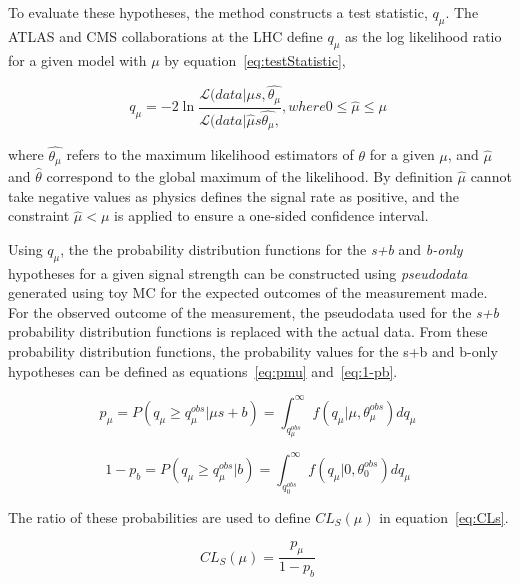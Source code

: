 To evaluate these hypotheses, the method constructs a test statistic, $q_{\mu}$.
The ATLAS and CMS collaborations at the LHC define $q_{\mu}$ as the log likelihood ratio for a given model with $\mu$ by equation~\ref{eq:testStatistic},

\begin{equation}
q_{\mu} =  -2 \ln \frac{ \mathcal{L}(data | \mu s , \hat{\theta_{\mu}}}{ \mathcal{L}(data | \hat{\mu} s \hat{\theta_{\mu}},  } , where 0 \leq \hat{\mu} \leq \mu \;
\label{eq:testStatistic}
\end{equation}

where $\hat{\theta_{\mu}}$ refers to the maximum likelihood estimators of $\theta$ for a given $\mu$, and 
$\hat{\mu}$ and $\hat{\theta}$ correspond to the global maximum of the likelihood. 
By definition $\hat{\mu}$ cannot take negative values as physics defines the signal rate as positive, and the constraint $\hat{\mu} < \mu$ is applied to ensure a one-sided confidence interval.

Using $q_{\mu}$, the the probability distribution functions for the \emph{s+b} and \emph{b-only} hypotheses for a given signal strength can be constructed using \emph{pseudodata} generated using toy MC for the expected outcomes of the measurement made.
For the observed outcome of the measurement, the pseudodata used for the \emph{s+b} probability distribution functions is replaced with the actual data.
From these probability distribution functions, the probability values for the s+b and b-only hypotheses can be defined as equations~\ref{eq:pmu} and~\ref{eq:1-pb}.

\begin{equation}
p_{\mu} = P ( q_{\mu} \geq  q_{\mu}^{obs} | \mu s + b ) = \int^{\infty}_{q_{\mu}^{obs}} f ( q_{\mu} | \mu , \theta_{\mu}^{obs} ) dq_{\mu} \;
\label{eq:pmu}
\end{equation}

\begin{equation}
1 - p_{b} = P ( q_{\mu} \geq  q_{\mu}^{obs} | b ) = \int^{\infty}_{q_{0}^{obs}} f ( q_{\mu} | 0 , \theta_{0}^{obs} ) dq_{\mu} \;
\label{eq:1-pb}
\end{equation}

The ratio of these probabilities are used to define $CL_{S} (\mu)$ in equation~\ref{eq:CLs}.

\begin{equation}
CL_{S} (\mu) = \frac{ p_{\mu} }{ 1 - p_{b} }\;
\label{eq:CLs}
\end{equation}

